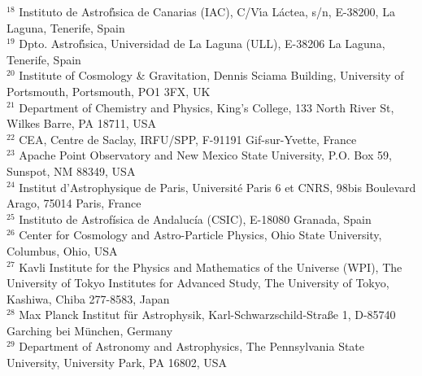 {\scriptsize $^{18}$ Instituto de Astrof{\'\i}sica de Canarias (IAC), C/V{\'\i}a L\'actea, s/n, E-38200, La Laguna, Tenerife, Spain\vspace*{-2pt} \\ 
\scriptsize $^{19}$ Dpto. Astrof{\'\i}sica, Universidad de La Laguna (ULL), E-38206 La Laguna, Tenerife, Spain\vspace*{-2pt} \\ 
\scriptsize $^{20}$ Institute of Cosmology \& Gravitation, Dennis Sciama Building, University of Portsmouth, Portsmouth, PO1 3FX, UK\vspace*{-2pt} \\ 
\scriptsize $^{21}$ Department of Chemistry and Physics, King's College, 133 North River St, Wilkes Barre, PA 18711, USA\vspace*{-2pt} \\ 
\scriptsize $^{22}$ CEA, Centre de Saclay, IRFU/SPP, F-91191 Gif-sur-Yvette, France\vspace*{-2pt} \\ 
\scriptsize $^{23}$ Apache Point Observatory and New Mexico State University, P.O. Box 59, Sunspot, NM 88349, USA\vspace*{-2pt} \\ 
\scriptsize $^{24}$ Institut d'Astrophysique de Paris, Universit\'e Paris 6 et CNRS, 98bis Boulevard Arago, 75014 Paris, France\vspace*{-2pt} \\ 
\scriptsize $^{25}$ Instituto de Astrof\'isica de Andaluc\'ia (CSIC), E-18080 Granada, Spain\vspace*{-2pt} \\ 
\scriptsize $^{26}$ Center for Cosmology and Astro-Particle Physics, Ohio State University, Columbus, Ohio, USA\vspace*{-2pt} \\ 
\scriptsize $^{27}$ Kavli Institute for the Physics and Mathematics of the Universe (WPI), The University of Tokyo Institutes for Advanced Study, The University of Tokyo, Kashiwa, Chiba 277-8583, Japan\vspace*{-2pt} \\ 
\scriptsize $^{28}$ Max Planck Institut f\"ur Astrophysik, Karl-Schwarzschild-Stra{\ss}e 1, D-85740 Garching bei M\"unchen, Germany\vspace*{-2pt} \\ 
\scriptsize $^{29}$ Department of Astronomy and Astrophysics, The Pennsylvania State University, University Park, PA 16802, USA\vspace*{-2pt} \\ 
}
